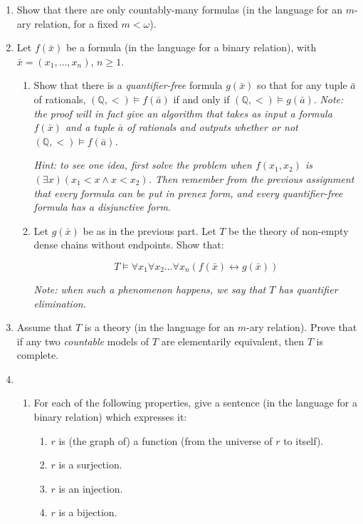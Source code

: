 \documentclass{amsart}
\theoremstyle{definition}
\newcommand{\ba}{\bar{a}}
\newcommand{\bx}{\bar{x}}
\begin{document}
\begin{enumerate}
\item Show that there are only countably-many formulas (in the language for an $m$-ary relation, for a fixed $m < \omega$).
\item Let $f (\bx)$ be a formula (in the language for a binary relation), with $\bx = (x_1, \ldots, x_n)$, $n \ge 1$.
  \begin{enumerate}
  \item Show that there is a \emph{quantifier-free} formula $g (\bx)$ so that for any tuple $\ba$ of rationals, $(\mathbb{Q}, <) \models f (\ba)$ if and only if $(\mathbb{Q}, <) \models g (\ba)$. \emph{Note: the proof will in fact give an algorithm that takes as input a formula $f (\bx)$ and a tuple $\ba$ of rationals and outputs whether or not $(\mathbb{Q}, <) \models f (\ba)$.}

    \emph{Hint: to see one idea, first solve the problem when $f (x_1, x_2)$ is $(\exists x) (x_1 < x \land x < x_2)$. Then remember from the previous assignment that every formula can be put in prenex form, and every quantifier-free formula has a disjunctive form.}
  \item Let $g (\bx)$ be as in the previous part. Let $T$ be the theory of non-empty dense chains without endpoints. Show that:
    
    $$T
    \models \forall x_1 \forall x_2 \ldots \forall x_n \left(f (\bx) \leftrightarrow g (\bx)\right)
    $$

    \emph{Note: when such a phenomenon happens, we say that $T$ has quantifier elimination.}
  \end{enumerate}

\item Assume that $T$ is a theory (in the language for an $m$-ary relation). Prove that if any two \emph{countable} models of $T$ are elementarily equivalent, then $T$ is complete.
\item
  
  \begin{enumerate}
  \item For each of the following properties, give a sentence (in the language for a binary relation) which expresses it:
    \begin{enumerate}
    \item $r$ is (the graph of) a function (from the universe of $r$ to itself).
    \item $r$ is a surjection.
    \item $r$ is an injection.
    \item $r$ is a bijection.
    \end{enumerate}


\end{enumerate}
\end{enumerate}
\end{document}
